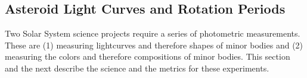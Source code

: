 %
%
%
%
%
%
%
%
%
%
%
%
%
%
%

\subsection{Asteroid Light Curves and Rotation Periods}

Two Solar System science projects require a series of photometric
measurements. These are (1) measuring lightcurves and therefore shapes
of minor bodies and (2) measuring the colors and therefore compositions
of minor bodies. This section and the next describe the science and the
metrics for these experiments.

